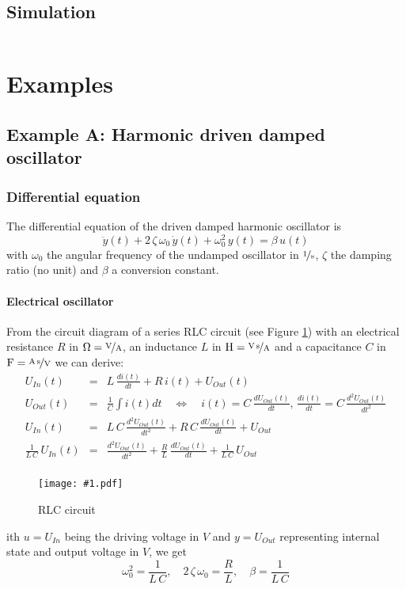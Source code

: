 \documentclass[a4paper,12pt]{article}
\newcommand{\Fig}[4]{%
\begin{figure}[htb]%
\begin{center}%
\texttt{[image: \#1.pdf]}%
\end{center}%
\caption{#3\label{fig:#1}}%
\end{figure}%
}
\newcommand{\FigRef}[1]{Figure \ref{fig:#1}}
\newcommand{\pfrac}[2]{\frac{#1}{#2}}
\newcommand{\Section}[2]{\section{#2}\label{section:#1}}
\newcommand{\SubSection}[2]{\subsection{#2}\label{subsection:#1}}
\newcommand{\SubSubSection}[2]{\subsubsection{#2}\label{subsubsection:#1}}
\begin{document}
\SubSection{simu}{Simulation}

\inputminted[tabsize=4]{python}{simulate.py}




\Section{examples}{Examples}

\SubSection{oscillator}{Example A: Harmonic driven damped oscillator}

\SubSubSection{diffeqA}{Differential equation}

The differential equation of the driven damped harmonic oscillator is
\begin{equation}
\ddot{y}(t)+2\,\zeta\,\omega_0\,\dot{y}(t)+\omega_0^2\,y(t)=\beta\,u(t)
\end{equation}
with $\omega_0$ the angular frequency of the undamped oscillator in
$\unitfrac{1}{s}$, $\zeta$ the damping ratio (no unit) and $\beta$ a
conversion constant.\\

\paragraph{Electrical oscillator}

From the circuit diagram of a series RLC circuit (see \FigRef{elecoscil}) with
an electrical resistance $R$ in $\unit{\Omega}=\unitfrac{V}{A}$, an inductance
$L$ in $\unit{H}=\unitfrac{V\,s}{A}$ and a capacitance $C$ in
$\unit{F}=\unitfrac{A\,s}{V}$ we can derive:
\begin{eqnarray}
U_{In}(t)&=&L\,\frac{di(t)}{dt}+R\,i(t)+U_{Out}(t)\\
U_{Out}(t)&=&\frac{1}{C}\int i(t)dt\quad\Leftrightarrow\quad i(t)=C\,\frac{dU_{Out}(t)}{dt},\,\frac{di(t)}{dt}=C\,\frac{d^2U_{Out}(t)}{dt^2}\\
U_{In}(t)&=&L\,C\,\frac{d^2U_{Out}(t)}{dt^2}+R\,C\,\frac{dU_{Out}(t)}{dt}+U_{Out}\\
\frac{1}{L\,C}\,U_{In}(t)&=&\frac{d^2U_{Out}(t)}{dt^2}+\frac{R}{L}\,\frac{dU_{Out}(t)}{dt}+\frac{1}{L\,C}\,U_{Out}\\
\end{eqnarray}

\Fig{elecoscil}{0.5}{RLC circuit}

With $u=U_{In}$ being the driving voltage in $\unit{V}$ and $y=U_{Out}$
representing internal state and output voltage in $\unit{V}$, we get
\begin{equation}
\omega_0^2=\pfrac{1}{L\,C},\quad2\,\zeta\,\omega_0=\pfrac{R}{L},\quad\beta=\pfrac{1}{L\,C}
\end{equation}
\end{document}
